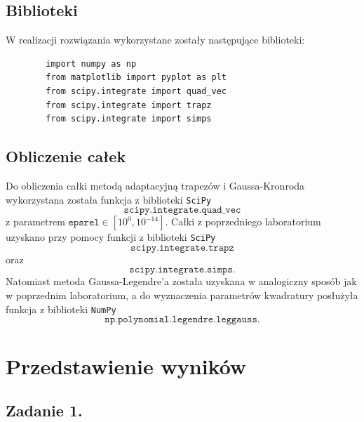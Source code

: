 \documentclass[11pt]{scrartcl}
\begin{document}
    \subsection{Biblioteki}
    W realizacji rozwiązania wykorzystane zostały następujące
    biblioteki:
    \begin{lstlisting}
        import numpy as np
        from matplotlib import pyplot as plt
        from scipy.integrate import quad_vec
        from scipy.integrate import trapz
        from scipy.integrate import simps
    \end{lstlisting}

    \subsection{Obliczenie całek}
    Do obliczenia całki metodą adaptacyjną trapezów
    i Gaussa-Kronroda wykorzystana została funkcja
    z biblioteki \texttt{SciPy}
    \[
        \texttt{scipy.integrate.quad\_vec}
    \]
    z parametrem $\texttt{epsrel} \in [10^0,10^{-14}]$. Całki
    z poprzedniego laboratorium uzyskano przy pomocy funkcji
    z biblioteki \texttt{SciPy}
    \[
        \texttt{scipy.integrate.trapz}
    \]
    oraz
    \[
        \texttt{scipy.integrate.simps}.
    \]
    Natomiast metoda Gaussa-Legendre'a została uzyskana
    w analogiczny sposób jak w poprzednim laboratorium, a do
    wyznaczenia parametrów kwadratury posłużyła funkcja
    z biblioteki \texttt{NumPy}
    \[
        \texttt{np.polynomial.legendre.leggauss}.
    \]

    \section{Przedstawienie wyników}
    \subsection{Zadanie 1.}
\end{document}
